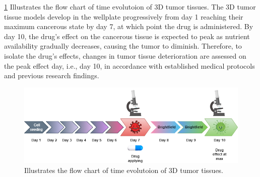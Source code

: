 \ref{fig:time} Illustrates the flow chart of time evolutoion of 3D tumor tissues.
The 3D tumor tissue models develop in the wellplate progressively from day 1 reaching their maximum cancerous state by day 7, at which point the drug is 
administered. By day 10, the drug's effect on the cancerous tissue is expected to peak as nutrient availability gradually decreases, causing the tumor to 
diminish. Therefore, to isolate the drug's effects, changes in tumor tissue deterioration are assessed on the peak effect day, i.e., day 10, in 
accordance with established medical protocols and previous research findings.

\begin{figure}[H]
  \centering
  \includegraphics[scale=0.7]{figures/timed.png} 
  \caption{Illustrates the flow chart of time evolutoion of 3D tumor tissues.}
  \label{fig:time}
\end{figure}
\let\cleardoublepage\clearpage

